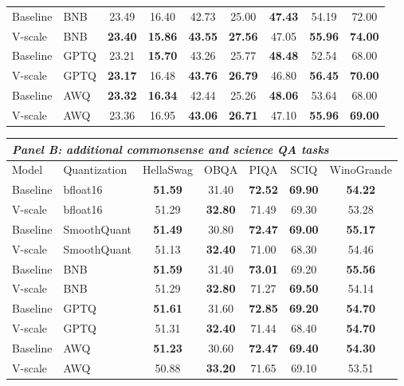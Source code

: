 \documentclass{article}
\theoremstyle{plain}
\theoremstyle{definition}
\theoremstyle{remark}
\begin{document}
\begin{table}[ht]
\begin{tabular}{llccccccc}
        Baseline & BNB & 23.49 & 16.40 & 42.73 & 25.00 & \textbf{47.43} & 54.19 & 72.00 \\
        V-scale & BNB & \textbf{23.40} & \textbf{15.86} & \textbf{43.55} & \textbf{27.56} & 47.05 & \textbf{55.96} & \textbf{74.00} \\
        Baseline & GPTQ & 23.21 & \textbf{15.70} & 43.26 & 25.77 & \textbf{48.48} & 52.54 & 68.00 \\
        V-scale & GPTQ & \textbf{23.17} & 16.48 & \textbf{43.76} & \textbf{26.79} & 46.80 & \textbf{56.45} & \textbf{70.00} \\
        Baseline & AWQ & \textbf{23.32} & \textbf{16.34} & 42.44 & 25.26 & \textbf{48.06} & 53.64 & 68.00 \\
        V-scale & AWQ & 23.36 & 16.95 & \textbf{43.06} & \textbf{26.71} & 47.10 & \textbf{55.96} & \textbf{69.00} \\
        \bottomrule
    \end{tabular}
    \begin{tabular}{llccccc}
        \toprule
        \multicolumn{7}{l}{\emph{Panel B: additional commonsense and science QA tasks}} \\
        \midrule
        Model & Quantization & HellaSwag & OBQA & PIQA & SCIQ & WinoGrande \\
        \midrule
        Baseline & bfloat16 & \textbf{51.59} & 31.40 & \textbf{72.52} & \textbf{69.90} & \textbf{54.22} \\
        V-scale & bfloat16 & 51.29 & \textbf{32.80} & 71.49 & 69.30 & 53.28 \\
        Baseline & SmoothQuant & \textbf{51.49} & 30.80 & \textbf{72.47} & \textbf{69.00} & \textbf{55.17} \\
        V-scale & SmoothQuant & 51.13 & \textbf{32.40} & 71.00 & 68.30 & 54.46 \\
        Baseline & BNB & \textbf{51.59} & 31.40 & \textbf{73.01} & 69.20 & \textbf{55.56} \\
        V-scale & BNB & 51.29 & \textbf{32.80} & 71.27 & \textbf{69.50} & 54.14 \\
        Baseline & GPTQ & \textbf{51.61} & 31.60 & \textbf{72.85} & \textbf{69.20} & \textbf{54.70} \\
        V-scale & GPTQ & 51.31 & \textbf{32.40} & 71.44 & 68.40 & \textbf{54.70} \\
        Baseline & AWQ & \textbf{51.23} & 30.60 & \textbf{72.47} & \textbf{69.40} & \textbf{54.30} \\
        V-scale & AWQ & 50.88 & \textbf{33.20} & 71.65 & 69.10 & 53.51 \\
        \bottomrule
    \end{tabular}
\end{table}
\end{document}
